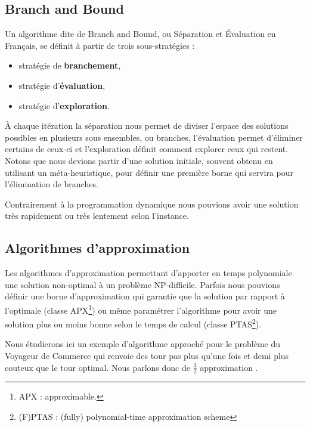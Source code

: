 \subsection{Branch and Bound}
Un algorithme dite de Branch and Bound, ou Séparation et Évaluation en Français, se définit à partir de trois sous-stratégies :

\begin{itemize}
\item stratégie de \textbf{branchement},
\item stratégie d'\textbf{évaluation},
\item stratégie d'\textbf{exploration}.
\end{itemize}

À chaque itération la séparation nous permet de diviser l'espace des solutions possibles en plusieurs sous ensembles, ou branches, l'évaluation permet d'éliminer certains de ceux-ci et l'exploration définit comment explorer ceux qui restent. Notons que nous devions partir d'une solution initiale, souvent obtenu en utilisant un méta-heuristique, pour définir une première borne qui servira pour l'élimination de branches. 

Contrairement à la programmation dynamique nous pouvions avoir une solution très rapidement ou très lentement selon l'instance. 

\subsection{Algorithmes d'approximation}
Les algorithmes d'approximation permettant d'apporter en temps polynomiale une
solution non-optimal à un problème NP-difficile. Parfois nous pouvions définir une borne d'approximation qui garantie que la solution par rapport à l'optimale (classe APX\footnote{APX : approximable. }) ou même paramétrer l'algorithme pour avoir une solution plus ou moins bonne selon le temps de calcul (classe PTAS\footnote{(F)PTAS : (fully) polynomial-time approximation scheme}).  

Nous étudierons ici un exemple d'algorithme approché pour le problème du 
Voyageur de Commerce qui renvoie des tour pas plus qu'une fois et demi plus
couteux que le tour optimal. Nous parlons donc de \og $\frac{3}{2}$ approximation \fg{}.
